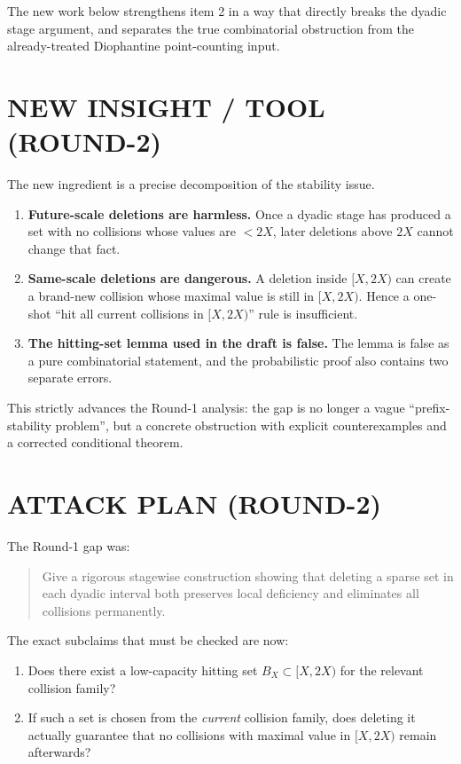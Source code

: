 The new work below strengthens item 2 in a way that directly breaks the dyadic stage argument, and separates the true combinatorial obstruction from the already-treated Diophantine point-counting input.

\section{NEW INSIGHT / TOOL (ROUND-2)}

The new ingredient is a precise decomposition of the stability issue.

\begin{enumerate}
\item \textbf{Future-scale deletions are harmless.} Once a dyadic stage has produced a set with no collisions whose values are $<2X$, later deletions above $2X$ cannot change that fact.

\item \textbf{Same-scale deletions are dangerous.} A deletion inside $[X,2X)$ can create a brand-new collision whose maximal value is still in $[X,2X)$. Hence a one-shot ``hit all current collisions in $[X,2X)$'' rule is insufficient.

\item \textbf{The hitting-set lemma used in the draft is false.} The lemma is false as a pure combinatorial statement, and the probabilistic proof also contains two separate errors.
\end{enumerate}

This strictly advances the Round-1 analysis: the gap is no longer a vague ``prefix-stability problem'', but a concrete obstruction with explicit counterexamples and a corrected conditional theorem.

\section{ATTACK PLAN (ROUND-2)}

The Round-1 gap was:

\begin{quote}
Give a rigorous stagewise construction showing that deleting a sparse set in each dyadic interval both preserves local deficiency and eliminates all collisions permanently.
\end{quote}

The exact subclaims that must be checked are now:

\begin{enumerate}
\item[(G1)] Does there exist a low-capacity hitting set $B_X\subset [X,2X)$ for the relevant collision family?
\item[(G2)] If such a set is chosen from the \emph{current} collision family, does deleting it actually guarantee that no collisions with maximal value in $[X,2X)$ remain afterwards?
\end{enumerate}

